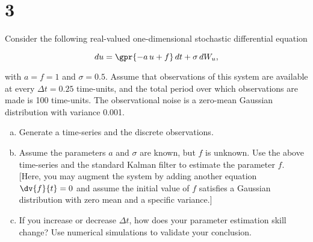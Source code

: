 \section{3}

Consider the following real-valued one-dimensional stochastic differential equation

\begin{equation}
	du = \gpr{-a\,u + f}\,dt + \sigma\,dW_{u},
\end{equation}

with $a = f = 1$ and $\sigma = 0.5$. Assume that observations of this system are available at every $\Delta t = 0.25$ time-units, and the total period over which observations are made is 100 time-units. The observational noise is a zero-mean Gaussian distribution with variance 0.001.

\begin{enumerate}[a)]
	\item Generate a time-series and the discrete observations.
	
	\item Assume the parameters $a$ and $\sigma$ are known, but $f$ is unknown. Use the above time-series and the standard Kalman filter to estimate the parameter $f$. [Here, you may augment the system by adding another equation $\dv{f}{t} = 0$ and assume the initial value of $f$ satisfies a Gaussian distribution with zero mean and a specific variance.]
	
	\item If you increase or decrease $\Delta t$, how does your parameter estimation skill change? Use numerical simulations to validate your conclusion.
\end{enumerate}

